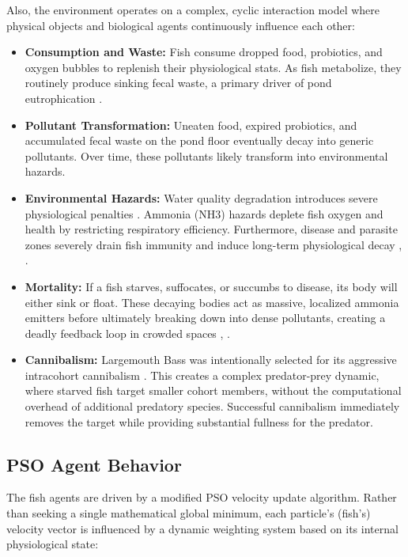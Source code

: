 \documentclass[conference]{IEEEtran}
\begin{document}
Also, the environment operates on a complex, cyclic interaction model where physical objects and biological agents continuously influence each other:
\begin{itemize}
    \item \textbf{Consumption and Waste:} Fish consume dropped food, probiotics, and oxygen bubbles to replenish their physiological stats. As fish metabolize, they routinely produce sinking fecal waste, a primary driver of pond eutrophication \cite{hou2023}.
    \item \textbf{Pollutant Transformation:} Uneaten food, expired probiotics, and accumulated fecal waste on the pond floor eventually decay into generic pollutants. Over time, these pollutants likely transform into environmental hazards.
    \item \textbf{Environmental Hazards:} Water quality degradation introduces severe physiological penalties \cite{hou2023}. Ammonia (NH3) hazards deplete fish oxygen and health by restricting respiratory efficiency. Furthermore, disease and parasite zones severely drain fish immunity and induce long-term physiological decay \cite{bowker2013}, \cite{tu2025}.
    \item \textbf{Mortality:} If a fish starves, suffocates, or succumbs to disease, its body will either sink or float. These decaying bodies act as massive, localized ammonia emitters before ultimately breaking down into dense pollutants, creating a deadly feedback loop in crowded spaces \cite{hou2023}, \cite{bowker2013}.
    \item \textbf{Cannibalism:} Largemouth Bass was intentionally selected for its aggressive intracohort cannibalism \cite{johnson1996}. This creates a complex predator-prey dynamic, where starved fish target smaller cohort members, without the computational overhead of additional predatory species. Successful cannibalism immediately removes the target while providing substantial fullness for the predator.
\end{itemize}
\subsection{PSO Agent Behavior}
The fish agents are driven by a modified PSO velocity update algorithm. Rather than seeking a single mathematical global minimum, each particle's (fish's) velocity vector is influenced by a dynamic weighting system based on its internal physiological state:
\end{document}
